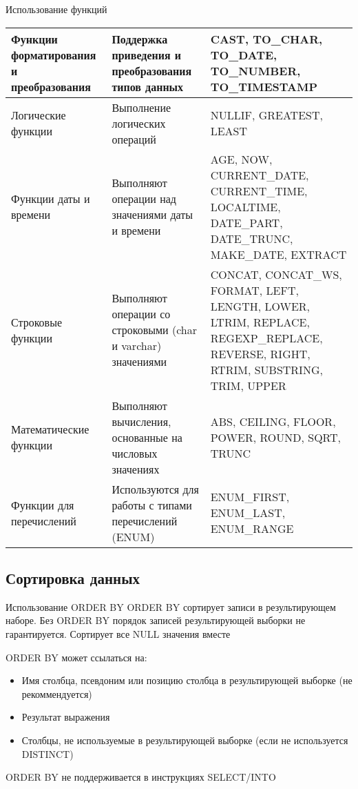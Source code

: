 \documentclass[12pt]{article}
\begin{document}
\begin{nota}{Использование функций}
    \begin{center}
        \begin{tabular}{|m{9em}|m{12em}|m{15em}|}
            \hline
            Функции форматирования и преобразования & Поддержка приведения и преобразования типов данных & CAST, TO\_CHAR, TO\_DATE, TO\_NUMBER, TO\_TIMESTAMP \\
            \hline
            Логические функции & Выполнение логических операций & NULLIF, GREATEST, LEAST \\
            \hline
            Функции даты и времени & Выполняют операции над значениями даты и времени & AGE, NOW, CURRENT\_DATE, CURRENT\_TIME, LOCALTIME, DATE\_PART, DATE\_TRUNC, MAKE\_DATE, EXTRACT \\
            \hline
            Строковые функции & Выполняют операции со строковыми (char и varchar) значениями & CONCAT, CONCAT\_WS, FORMAT, LEFT, LENGTH, LOWER, LTRIM, REPLACE, REGEXP\_REPLACE, REVERSE, RIGHT, RTRIM, SUBSTRING, TRIM, UPPER \\
            \hline
            Математические функции & Выполняют вычисления, основанные на числовых значениях & ABS, CEILING, FLOOR, POWER, ROUND, SQRT, TRUNC \\
            \hline
            Функции для перечислений & Используются для работы с типами перечислений (ENUM) & ENUM\_FIRST, ENUM\_LAST, ENUM\_RANGE \\
            \hline
        \end{tabular}
    \end{center}
\end{nota}

\newpage

\subsection{Сортировка данных}

\begin{nota}{Использование ORDER BY}
    ORDER BY сортирует записи в результирующем наборе. Без ORDER BY порядок записей результирующей выборки не гарантируется. Сортирует все NULL значения вместе 

    ORDER BY может ссылаться на:

    \begin{itemize}
        \item Имя столбца, псевдоним или позицию столбца в результирующей выборке (не рекоммендуется)
        \item Результат выражения 
        \item Столбцы, не используемые в результирующей выборке (если не используется DISTINCT)
    \end{itemize}

    ORDER BY не поддерживается в инструкциях SELECT/INTO 
\end{nota}
\end{document}
